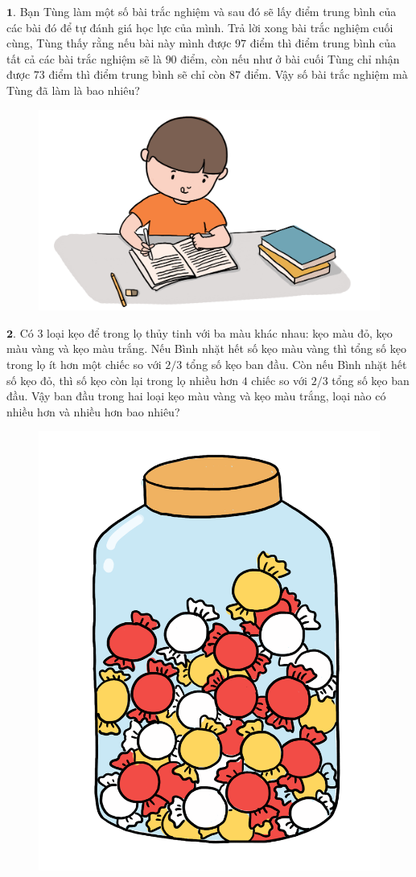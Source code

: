 \begin{multicols}{2}
	$\pmb{1.}$ Bạn Tùng làm một số bài trắc nghiệm và sau đó sẽ lấy điểm trung bình của các bài đó để tự đánh giá học lực của mình. Trả lời xong bài trắc nghiệm cuối cùng, Tùng thấy rằng nếu bài này mình được $97$ điểm thì điểm trung bình của tất cả các bài trắc nghiệm sẽ là $90$ điểm, còn nếu như ở bài cuối Tùng chỉ nhận được $73$ điểm thì điểm trung bình sẽ chỉ còn $87$ điểm. Vậy số bài trắc nghiệm mà Tùng đã làm là bao nhiêu?
	\begin{figure}[H]
		\centering
		\vspace*{-10pt}
		\captionsetup{labelformat= empty, justification=centering}
		\includegraphics[width=0.95\linewidth]{Pi12_Bai1}
		\vspace*{-10pt}
	\end{figure}
	\vskip 0.1cm
	$\pmb{2.}$ Có $3$ loại kẹo để trong lọ thủy tinh với ba màu khác nhau: kẹo màu đỏ, kẹo màu vàng và kẹo màu trắng. Nếu Bình nhặt hết số kẹo màu vàng thì tổng số kẹo trong lọ ít hơn một chiếc so với $2/3$ tổng số kẹo ban đầu. Còn nếu Bình nhặt hết số kẹo đỏ, thì số kẹo còn lại trong lọ nhiều hơn $4$ chiếc so với $2/3$ tổng số kẹo ban đầu.
	\vskip 0.1cm
	Vậy ban đầu trong hai loại kẹo màu vàng và kẹo màu trắng, loại nào có nhiều hơn và nhiều hơn bao nhiêu?
	\begin{figure}[H]
		\centering
		\vspace*{-10pt}
		\captionsetup{labelformat= empty, justification=centering}
		\includegraphics[width=0.45\linewidth]{Pi12_Bai2}

\end{figure}
\end{multicols}
